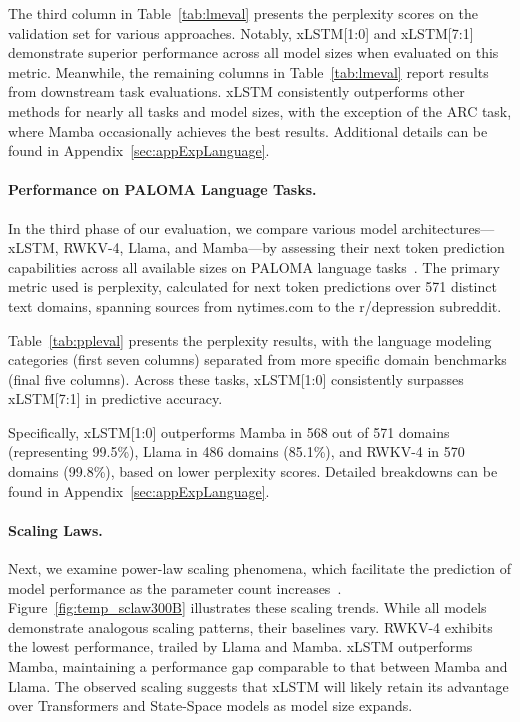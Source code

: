 The third column in Table~\ref{tab:lmeval} presents the perplexity scores on the validation set for various approaches. Notably, xLSTM[1:0] and xLSTM[7:1] demonstrate superior performance across all model sizes when evaluated on this metric. Meanwhile, the remaining columns in Table~\ref{tab:lmeval} report results from downstream task evaluations. xLSTM consistently outperforms other methods for nearly all tasks and model sizes, with the exception of the ARC task, where Mamba occasionally achieves the best results. Additional details can be found in Appendix~\ref{sec:appExpLanguage}.

\paragraph{Performance on PALOMA Language Tasks.} In the third phase of our evaluation, we compare various model architectures—xLSTM, RWKV-4, Llama, and Mamba—by assessing their next token prediction capabilities across all available sizes on PALOMA language tasks~\citep{Magnusson:23arxivshort}. The primary metric used is perplexity, calculated for next token predictions over 571 distinct text domains, spanning sources from nytimes.com to the r/depression subreddit.

Table~\ref{tab:ppleval} presents the perplexity results, with the language modeling categories (first seven columns) separated from more specific domain benchmarks (final five columns). Across these tasks, xLSTM[1:0] consistently surpasses xLSTM[7:1] in predictive accuracy.

Specifically, xLSTM[1:0] outperforms Mamba in 568 out of 571 domains (representing 99.5\%), Llama in 486 domains (85.1\%), and RWKV-4 in 570 domains (99.8\%), based on lower perplexity scores. Detailed breakdowns can be found in Appendix~\ref{sec:appExpLanguage}.

\paragraph{Scaling Laws.} Next, we examine power-law scaling phenomena, which facilitate the prediction of model performance as the parameter count increases~\citep{Kaplan:20,Brown:20short}.
Figure~\ref{fig:temp_sclaw300B} illustrates these scaling trends. While all models demonstrate analogous scaling patterns, their baselines vary. RWKV-4 exhibits the lowest performance, trailed by Llama and Mamba. xLSTM outperforms Mamba, maintaining a performance gap comparable to that between Mamba and Llama. The observed scaling suggests that xLSTM will likely retain its advantage over Transformers and State-Space models as model size expands.

